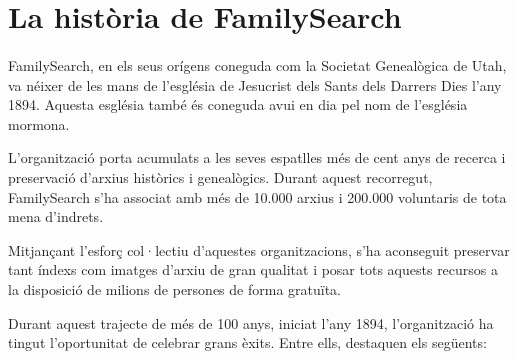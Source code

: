 \section{La història de FamilySearch}

    \paragraph{}
    FamilySearch, en els seus orígens coneguda com la Societat Genealògica de Utah, va néixer de les mans de l'església de Jesucrist dels Sants dels Darrers Dies l'any 1894. Aquesta església també és coneguda avui en dia pel nom de l'església mormona.

    L’organització porta acumulats a les seves espatlles més de cent anys de recerca i preservació d’arxius històrics i genealògics. Durant aquest recorregut, FamilySearch s’ha associat amb més de 10.000 arxius i 200.000 voluntaris de tota mena d’indrets.

    Mitjançant l’esforç col·lectiu d’aquestes organitzacions, s’ha aconseguit preservar tant índexs com imatges d’arxiu de gran qualitat i posar tots aquests recursos a la disposició de milions de persones de forma gratuïta.

    Durant aquest trajecte de més de 100 anys, iniciat l'any 1894, l'organització ha tingut l'oportunitat de celebrar grans èxits. Entre ells, destaquen els següents:


